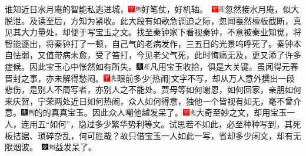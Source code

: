 {{谁知近日水月庵的智能私逃进城，{\includegraphics[width=3mm]{../Images/00002}\includegraphics[width=3mm]{../Images/00011}\footnotesize \kaishu 好笔仗，好机轴。　\includegraphics[width=3mm]{../Images/00002}\includegraphics[width=3mm]{../Images/00010}\footnotesize \kaishu 忽然接水月庵，似大脱泄。及读至后，方知为紧收。此大段有如歌急调迫之际，忽闻戛然檀板截断，真见其大力量处，却便于写宝玉之文。}找至秦钟家下看视秦钟，不意被秦业知觉，将智能逐出，将秦钟打了一顿，自己气的老病发作，三五日的光景呜呼死了。秦钟本自怯弱，又值带病未愈，受了笞打，今见老父气死，此时悔痛无及，更又添了许多症候。因此宝玉心中怅然如有所失。{\includegraphics[width=3mm]{../Images/00004}\includegraphics[width=3mm]{../Images/00010}\footnotesize \kaishu 凡用宝玉收拾，俱是大关键。}虽闻得元春晋封之事，亦未解得愁闷。{\includegraphics[width=3mm]{../Images/00002}\includegraphics[width=3mm]{../Images/00012}\footnotesize \kaishu 眼前多少{[}热闹{]}文字不写，却从万人意外撰出一段悲伤，是别人不屑写者，亦别人之不能处。}贾母等如何谢恩，如何回家，亲朋如何来庆贺，宁荣两处近日如何热闹，众人如何得意，独他一个皆视有如无，毫不曾介意。{\includegraphics[width=3mm]{../Images/00004}\includegraphics[width=3mm]{../Images/00011}\footnotesize \kaishu 的的真真宝玉。}因此众人嘲他越发呆了。{\includegraphics[width=3mm]{../Images/00002}\includegraphics[width=3mm]{../Images/00012}\footnotesize \kaishu 大奇至妙之文，却用宝玉一人，连用五“如何”，隐过多少繁华势利等文。试思若不如此，必至种种写到，其死板拮据、琐碎杂乱，何可胜哉？故只借宝玉一人如此一写，省却多少闲文，却有无限烟波。　\includegraphics[width=3mm]{../Images/00004}\includegraphics[width=3mm]{../Images/00011}\footnotesize \kaishu 益发呆了。}

}}
